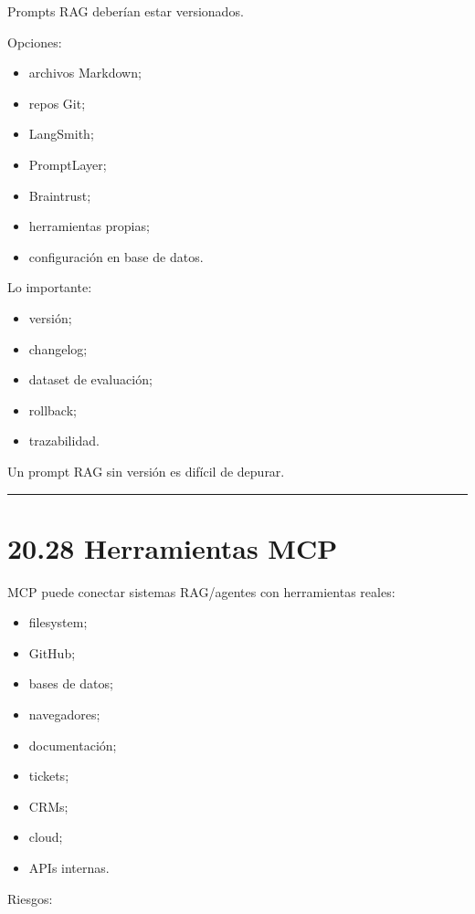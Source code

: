 Prompts RAG deberían estar versionados.

Opciones:

\begin{itemize}
\tightlist
\item
  archivos Markdown;
\item
  repos Git;
\item
  LangSmith;
\item
  PromptLayer;
\item
  Braintrust;
\item
  herramientas propias;
\item
  configuración en base de datos.
\end{itemize}

Lo importante:

\begin{itemize}
\tightlist
\item
  versión;
\item
  changelog;
\item
  dataset de evaluación;
\item
  rollback;
\item
  trazabilidad.
\end{itemize}

Un prompt RAG sin versión es difícil de depurar.

\begin{center}\rule{0.5\linewidth}{0.5pt}\end{center}

\section{20.28 Herramientas MCP}\label{herramientas-mcp}

MCP puede conectar sistemas RAG/agentes con herramientas reales:

\begin{itemize}
\tightlist
\item
  filesystem;
\item
  GitHub;
\item
  bases de datos;
\item
  navegadores;
\item
  documentación;
\item
  tickets;
\item
  CRMs;
\item
  cloud;
\item
  APIs internas.
\end{itemize}

Riesgos:


